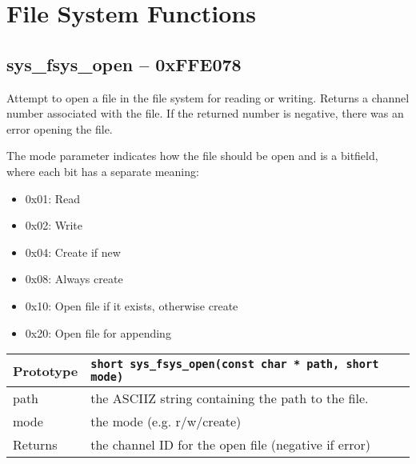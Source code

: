 \section{File System Functions}



\subsection*{sys\_fsys\_open -- 0xFFE078}
Attempt to open a file in the file system for reading or writing.
Returns a channel number associated with the file.
If the returned number is negative, there was an error opening the file.

The mode parameter indicates how the file should be open and is a bitfield, where each bit has a separate meaning:
\begin{itemize}
    \item 0x01: Read
    \item 0x02: Write
    \item 0x04: Create if new
    \item 0x08: Always create
    \item 0x10: Open file if it exists, otherwise create
    \item 0x20: Open file for appending
\end{itemize}

\bigskip		

\begin{tabular}{|l||l|} \hline
Prototype & \lstinline!short sys_fsys_open(const char * path, short mode)! \\ \hline
path & the ASCIIZ string containing the path to the file. \\ \hline
mode & the mode (e.g. r/w/create) \\ \hline
Returns & the channel ID for the open file (negative if error) \\ \hline
\end{tabular}

